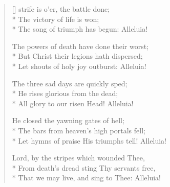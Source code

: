 \newHymn
{}

\begin{verse}[\versewidth]
 strife is o'er, the battle done;\\*
The victory of life is won;\\*
The song of triumph has begun: Alleluia!



The powers of death have done their worst;\\*
But Christ their legions hath dispersed;\\*
Let shouts of holy joy outburst: Alleluia!


The three sad days are quickly sped;\\*
He rises glorious from the dead;\\*
All glory to our risen Head! Alleluia!


He closed the yawning gates of hell;\\*
The bars from heaven's high portals fell;\\*
Let hymns of praise His triumphs tell! Alleluia!


Lord, by the stripes which wounded Thee,\\*
From death's dread sting Thy servants free,\\*
That we may live, and sing to Thee: Alleluia!

\end{verse}

